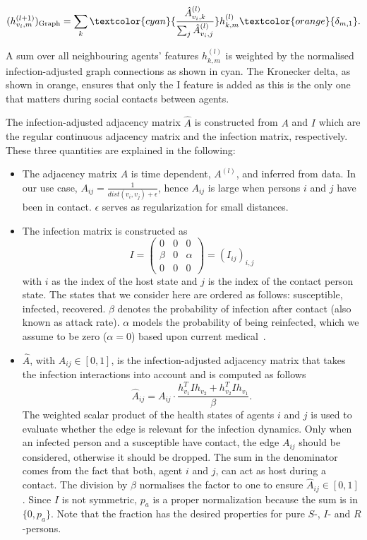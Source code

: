 \begin{equation}
	(h_{v_i, m}^{(l+1)})_{\text{Graph}} = 
	\sum_k \textcolor{cyan}{\frac{\hat{A}_{v_i, k}^{(l)}}{\sum_j \hat{A}_{v_i, j}^{(l)}}} h_{k, m}^{(l)} \textcolor{orange}{\delta_{m, 1}}.
\end{equation}

A sum over all neighbouring agents' features $h_{k,m}^{(l)}$ is weighted by the normalised infection-adjusted graph connections as shown in cyan. The Kronecker delta, as shown in orange, ensures that only the I feature is added as this is the only one that matters during social contacts between agents.

The infection-adjusted adjacency matrix $\hat{A}$ is constructed from $A$ and $I$ which are the regular continuous adjacency matrix and the infection matrix, respectively. These three quantities are explained in the following:
	
\begin{itemize}
	\item The adjacency matrix $A$ is time dependent, $A^{(l)}$, and inferred from data. In our use case, $A_{ij} = \frac{1}{dist(v_i, v_j)+\epsilon}$, hence $A_{ij}$ is large when persons $i$ and $j$ have been in contact. $\epsilon$ serves as regularization for small distances.
	\item The infection matrix is constructed as
	\begin{equation}
	I =
	\begin{pmatrix}
	0     &  0  & 0 \\
	\beta &  0  & \alpha \\
	0     &  0  & 0
	\end{pmatrix}
	=
	(I_{ij})_{i,j}
	\end{equation}
	with $i$ as the index of the host state and $j$ is the index of the contact person state. The states that we consider here are ordered as follows: susceptible, infected, recovered. $\beta$ denotes the probability of infection  after contact (also known as attack rate). $\alpha$ models the probability of being reinfected, which we assume to be zero ($\alpha=0$) based upon current medical~\cite{Bao2020.03.13.990226}.
	\item $\hat{A}$, with $\hat{A}_{ij}\in [0, 1]$, is the infection-adjusted adjacency matrix that takes the infection interactions into account and is computed as follows
	\begin{equation}
	\hat{A}_{ij} = A_{ij}\cdot \frac{ h_{v_1}^T I h_{v_2} + h_{v_2}^T I h_{v_1} }{\beta}.
	\end{equation}
	The weighted scalar product of the health states of agents $i$ and $j$ is used to evaluate whether the edge is relevant for the infection dynamics. Only when an infected person and a susceptible have contact, the edge $A_{ij}$ should be considered, otherwise it should be dropped.	The sum in the denominator comes from the fact that both, agent $i$ and $j$, can act as host during a contact. The division by $\beta$ normalises the factor to one to ensure $\hat{A}_{ij} \in [0, 1]$. Since $I$ is not symmetric, $p_a$ is a proper normalization because the sum is in $\{0, p_a\}$. Note that the fraction has the desired properties for pure $S$-, $I$- and $R$-persons.
\end{itemize}

